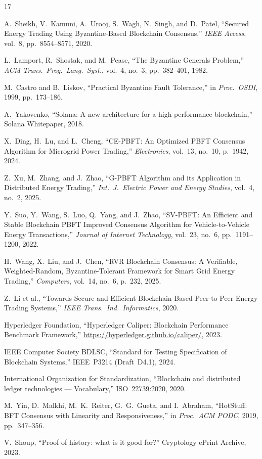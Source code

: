 \documentclass[10pt,twocolumn,letterpaper]{article}
\begin{document}
\begin{thebibliography}{17}

A.~Sheikh, V.~Kamuni, A.~Urooj, S.~Wagh, N.~Singh, and D.~Patel,
``Secured Energy Trading Using Byzantine-Based Blockchain Consensus,''
\emph{IEEE Access}, vol.~8, pp.~8554--8571, 2020.

L.~Lamport, R.~Shostak, and M.~Pease,
``The Byzantine Generals Problem,''
\emph{ACM Trans.\ Prog.\ Lang.\ Syst.}, vol.~4, no.~3, pp.~382--401, 1982.

M.~Castro and B.~Liskov,
``Practical Byzantine Fault Tolerance,''
in \emph{Proc.\ OSDI}, 1999, pp.~173--186.

A.~Yakovenko,
``Solana: A new architecture for a high performance blockchain,''
Solana Whitepaper, 2018.

X.~Ding, H.~Lu, and L.~Cheng,
``CE-PBFT: An Optimized PBFT Consensus Algorithm for Microgrid Power Trading,''
\emph{Electronics}, vol.~13, no.~10, p.~1942, 2024.

Z.~Xu, M.~Zhang, and J.~Zhao,
``G-PBFT Algorithm and its Application in Distributed Energy Trading,''
\emph{Int.\ J.\ Electric Power and Energy Studies}, vol.~4, no.~2, 2025.

Y.~Suo, Y.~Wang, S.~Luo, Q.~Yang, and J.~Zhao,
``SV-PBFT: An Efficient and Stable Blockchain PBFT Improved Consensus Algorithm for Vehicle-to-Vehicle Energy Transactions,''
\emph{Journal of Internet Technology}, vol.~23, no.~6, pp.~1191--1200, 2022.

H.~Wang, X.~Liu, and J.~Chen,
``RVR Blockchain Consensus: A Verifiable, Weighted-Random, Byzantine-Tolerant Framework for Smart Grid Energy Trading,''
\emph{Computers}, vol.~14, no.~6, p.~232, 2025.

Z.~Li et al.,
``Towards Secure and Efficient Blockchain-Based Peer-to-Peer Energy Trading Systems,''
\emph{IEEE Trans.\ Ind.\ Informatics}, 2020.

Hyperledger Foundation,
``Hyperledger Caliper: Blockchain Performance Benchmark Framework,''
\url{https://hyperledger.github.io/caliper/}, 2023.

IEEE Computer Society BDLSC,
``Standard for Testing Specification of Blockchain Systems,''
IEEE~P3214 (Draft~D4.1), 2024.

International Organization for Standardization,
``Blockchain and distributed ledger technologies --- Vocabulary,''
ISO~22739:2020, 2020.

M.~Yin, D.~Malkhi, M.~K.~Reiter, G.~G.~Gueta, and I.~Abraham,
``HotStuff: BFT Consensus with Linearity and Responsiveness,''
in \emph{Proc.\ ACM PODC}, 2019, pp.~347--356.

V.~Shoup,
``Proof of history: what is it good for?''
Cryptology ePrint Archive, 2023.

\end{thebibliography}
\end{document}
